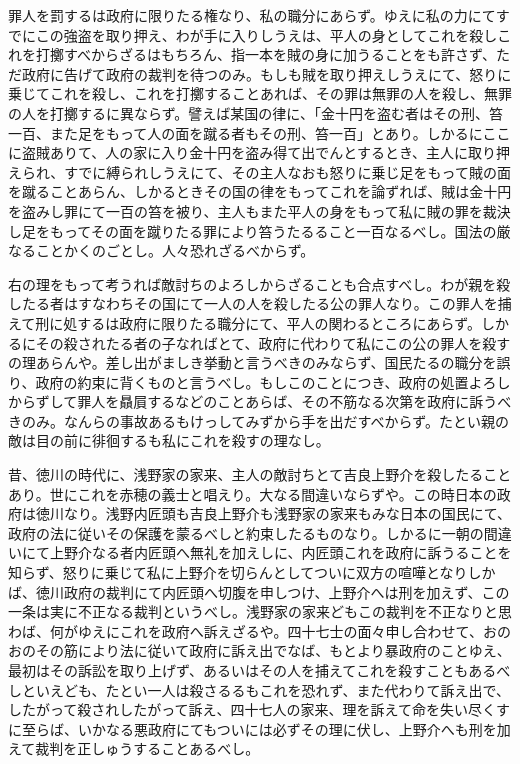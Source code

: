 \documentclass[a4paper, platex, dvipdfmx]{jsarticle}
\begin{document}
罪人を罰するは政府に限りたる権なり、私の職分にあらず。ゆえに私の力にてすでにこの強盗を取り押え、わが手に入りしうえは、平人の身としてこれを殺しこれを打擲すべからざるはもちろん、指一本を賊の身に加うることをも許さず、ただ政府に告げて政府の裁判を待つのみ。もしも賊を取り押えしうえにて、怒りに乗じてこれを殺し、これを打擲することあれば、その罪は無罪の人を殺し、無罪の人を打擲するに異ならず。譬えば某国の律に、「金十円を盗む者はその刑、笞一百、また足をもって人の面を蹴る者もその刑、笞一百」とあり。しかるにここに盗賊ありて、人の家に入り金十円を盗み得て出でんとするとき、主人に取り押えられ、すでに縛られしうえにて、その主人なおも怒りに乗じ足をもって賊の面を蹴ることあらん、しかるときその国の律をもってこれを論ずれば、賊は金十円を盗みし罪にて一百の笞を被り、主人もまた平人の身をもって私に賊の罪を裁決し足をもってその面を蹴りたる罪により笞うたるること一百なるべし。国法の厳なることかくのごとし。人々恐れざるべからず。

右の理をもって考うれば敵討ちのよろしからざることも合点すべし。わが親を殺したる者はすなわちその国にて一人の人を殺したる公の罪人なり。この罪人を捕えて刑に処するは政府に限りたる職分にて、平人の関わるところにあらず。しかるにその殺されたる者の子なればとて、政府に代わりて私にこの公の罪人を殺すの理あらんや。差し出がましき挙動と言うべきのみならず、国民たるの職分を誤り、政府の約束に背くものと言うべし。もしこのことにつき、政府の処置よろしからずして罪人を贔屓するなどのことあらば、その不筋なる次第を政府に訴うべきのみ。なんらの事故あるもけっしてみずから手を出だすべからず。たとい親の敵は目の前に徘徊するも私にこれを殺すの理なし。

昔、徳川の時代に、浅野家の家来、主人の敵討ちとて吉良上野介を殺したることあり。世にこれを赤穂の義士と唱えり。大なる間違いならずや。この時日本の政府は徳川なり。浅野内匠頭も吉良上野介も浅野家の家来もみな日本の国民にて、政府の法に従いその保護を蒙るべしと約束したるものなり。しかるに一朝の間違いにて上野介なる者内匠頭へ無礼を加えしに、内匠頭これを政府に訴うることを知らず、怒りに乗じて私に上野介を切らんとしてついに双方の喧嘩となりしかば、徳川政府の裁判にて内匠頭へ切腹を申しつけ、上野介へは刑を加えず、この一条は実に不正なる裁判というべし。浅野家の家来どもこの裁判を不正なりと思わば、何がゆえにこれを政府へ訴えざるや。四十七士の面々申し合わせて、おのおのその筋により法に従いて政府に訴え出でなば、もとより暴政府のことゆえ、最初はその訴訟を取り上げず、あるいはその人を捕えてこれを殺すこともあるべしといえども、たとい一人は殺さるるもこれを恐れず、また代わりて訴え出で、したがって殺されしたがって訴え、四十七人の家来、理を訴えて命を失い尽くすに至らば、いかなる悪政府にてもついには必ずその理に伏し、上野介へも刑を加えて裁判を正しゅうすることあるべし。
\end{document}
